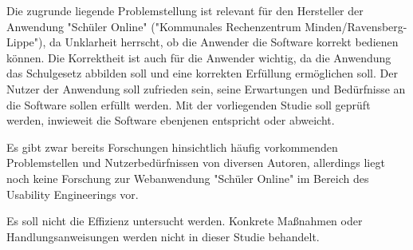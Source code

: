 Die zugrunde liegende Problemstellung ist relevant für den Hersteller der Anwendung "Schüler Online" ("Kommunales Rechenzentrum Minden/Ravensberg-Lippe"), da Unklarheit herrscht, ob die Anwender die Software korrekt bedienen können. Die Korrektheit ist auch für die Anwender wichtig, da die Anwendung das Schulgesetz abbilden soll und eine korrekten Erfüllung ermöglichen soll. Der Nutzer der Anwendung soll zufrieden sein, seine Erwartungen und Bedürfnisse an die Software sollen erfüllt werden. Mit der vorliegenden Studie soll geprüft werden, inwieweit die Software ebenjenen entspricht oder abweicht.

Es gibt zwar bereits Forschungen hinsichtlich häufig vorkommenden Problemstellen und Nutzerbedürfnissen von diversen Autoren, 
allerdings liegt noch keine Forschung zur Webanwendung "Schüler Online" im Bereich des Usability Engineerings vor. 

Es soll nicht die Effizienz untersucht werden.
Konkrete Maßnahmen oder Handlungsanweisungen werden nicht in dieser Studie behandelt.
